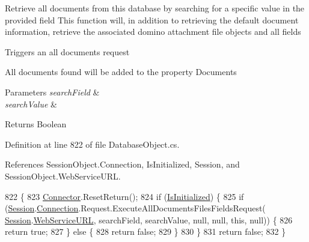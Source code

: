 Retrieve all documents from this database by searching for a specific value in the provided field This function will, in addition to retrieving the default document information, retrieve the associated domino attachment file objects and all fields 

Triggers an all documents request

All documents found will be added to the property \textquotesingle{}Documents\textquotesingle{}


\begin{DoxyParams}{Parameters}
{\em search\+Field} & \\
\hline
{\em search\+Value} & \\
\hline
\end{DoxyParams}
\begin{DoxyReturn}{Returns}
Boolean
\end{DoxyReturn}


Definition at line 822 of file Database\+Object.\+cs.



References Session\+Object.\+Connection, Is\+Initialized, Session, and Session\+Object.\+Web\+Service\+U\+RL.


\begin{DoxyCode}
822                                                                                               \{
823         \mbox{\hyperlink{class_connector}{Connector}}.ResetReturn();
824         \textcolor{keywordflow}{if} (\mbox{\hyperlink{class_database_object_a5fe036d32a30eb10d1b3f6a30263f740}{IsInitialized}}) \{
825             \textcolor{keywordflow}{if} (\mbox{\hyperlink{class_database_object_aa8484162b7d2a7c4c9426bca13c64c07}{Session}}.\mbox{\hyperlink{class_session_object_a014bdbf705a753540e19bfb53030c55c}{Connection}}.Request.ExecuteAllDocumentsFilesFieldsRequest(
      \mbox{\hyperlink{class_database_object_aa8484162b7d2a7c4c9426bca13c64c07}{Session}}.\mbox{\hyperlink{class_session_object_a697c071c812fbf7ad1166b896fb44c16}{WebServiceURL}}, searchField, searchValue, null, null, \textcolor{keyword}{this}, null)) \{
826                 \textcolor{keywordflow}{return} \textcolor{keyword}{true};
827             \} \textcolor{keywordflow}{else} \{
828                 \textcolor{keywordflow}{return} \textcolor{keyword}{false};
829             \}
830         \}
831         \textcolor{keywordflow}{return} \textcolor{keyword}{false};
832     \}
\end{DoxyCode}
\mbox{\label{class_database_object_a6f7a8cf66063a0b1ae67bc59f4589102}} 
